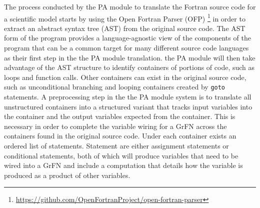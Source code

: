 The process conducted by the PA module to translate the Fortran source code for a scientific model starts by using the Open Fortran Parser (OFP) \footnote{\url{https://github.com/OpenFortranProject/open-fortran-parser}} in order to extract an abstract syntax tree (AST) \citep{aho1986dragonBook} from the original source code.
The AST form of the program provides a language-agnostic view of the components of the program that can be a common target for many different source code languages as their first step in the the PA module translation.
the PA module will then take advantage of the AST structure to identify containers of portions of code, such as loops and function calls.
Other containers can exist in the original source code, such as unconditional branching and looping containers created by \texttt{goto} statements.
A preprocessing step in the the PA module system is to translate all unstructured containers into a structured variant that tracks input variables into the container and the output variables expected from the container.
This is necessary in order to complete the variable wiring for a GrFN across the containers found in the original source code.
Under each container exists an ordered list of statements.
Statement are either assignment statements or conditional statements, both of which will produce variables that need to be wired into a GrFN and include a computation that details how the variable is produced as a product of other variables.

